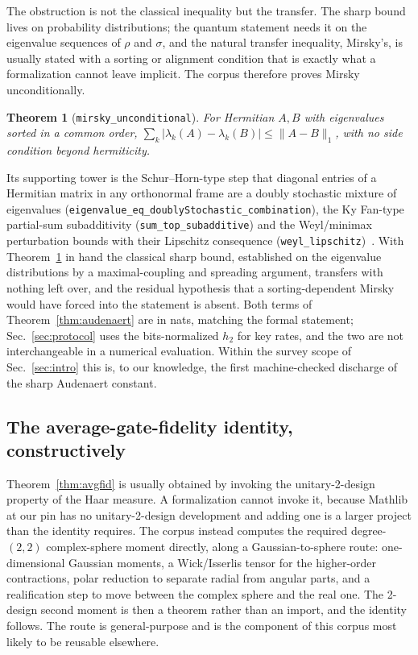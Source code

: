 \documentclass[aps,pra,reprint,nofootinbib,superscriptaddress]{revtex4-2}
\theoremstyle{plain}
\newtheorem{theorem}{Theorem}
\theoremstyle{definition}
\theoremstyle{remark}
\newcommand{\lean}[1]{\texttt{#1}}
\newcommand{\trnorm}[1]{\lVert #1 \rVert_{1}}
\begin{document}
The obstruction is not the classical inequality but the transfer. The
sharp bound~\cite{Audenaert2007} lives on probability distributions; the
quantum statement needs it on the eigenvalue sequences of $\rho$ and
$\sigma$, and the natural transfer inequality, Mirsky's, is usually
stated with a sorting or alignment condition that is exactly what a
formalization cannot leave implicit. The corpus therefore proves Mirsky
unconditionally.

\begin{theorem}[\lean{mirsky\_unconditional}]
\label{thm:mirsky}
For Hermitian $A,B$ with eigenvalues sorted in a common order,
$\sum_k |\lambda_k(A)-\lambda_k(B)| \le \trnorm{A-B}$, with no side
condition beyond hermiticity.
\end{theorem}

Its supporting tower is the Schur--Horn-type step that diagonal entries
of a Hermitian matrix in any orthonormal frame are a doubly stochastic
mixture of eigenvalues
(\lean{eigenvalue\_eq\_doublyStochastic\_combination}), the Ky Fan-type
partial-sum subadditivity (\lean{sum\_top\_subadditive}) and the
Weyl/minimax perturbation bounds with their Lipschitz consequence
(\lean{weyl\_lipschitz})~\cite{Bhatia1997}. With
Theorem~\ref{thm:mirsky} in hand the classical sharp bound, established
on the eigenvalue distributions by a maximal-coupling and spreading
argument, transfers with nothing left over, and the residual hypothesis
that a sorting-dependent Mirsky would have forced into the statement is
absent. Both terms of Theorem~\ref{thm:audenaert} are in nats, matching
the formal statement; Sec.~\ref{sec:protocol} uses the bits-normalized
$h_2$ for key rates, and the two are not interchangeable in a numerical
evaluation. Within the survey scope of Sec.~\ref{sec:intro} this is, to
our knowledge, the first machine-checked discharge of the sharp
Audenaert constant.

\subsection{The average-gate-fidelity identity, constructively}

Theorem~\ref{thm:avgfid} is usually obtained by invoking the
unitary-2-design property of the Haar measure. A formalization cannot
invoke it, because Mathlib at our pin has no unitary-2-design
development and adding one is a larger project than the identity
requires. The corpus instead computes the required degree-$(2,2)$
complex-sphere moment directly, along a Gaussian-to-sphere route:
one-dimensional Gaussian moments, a Wick/Isserlis tensor for the
higher-order contractions, polar reduction to separate radial from
angular parts, and a realification step to move between the complex
sphere and the real one. The 2-design second moment is then a theorem
rather than an import, and the identity follows. The route is
general-purpose and is the component of this corpus most likely to be
reusable elsewhere.
\end{document}
